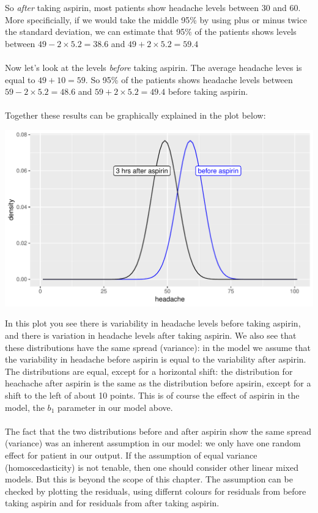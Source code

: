 \documentclass[]{report}\usepackage[]{graphicx}\usepackage[]{color}
\makeatletter
\def\maxwidth{ %
  \ifdim\Gin@nat@width>\linewidth
    \linewidth
  \else
    \Gin@nat@width
  \fi
}
\newenvironment{knitrout}{}{} %
\makeatother
\begin{document}
So \textit{after} taking aspirin, most patients show headache levels between 30 and 60. More specificially, if we would take the middle 95\% by using plus or minus twice the standard deviation, we can estimate that 95\% of the patients shows levels between $49 - 2 \times 5.2 = 38.6$ and $49 + 2 \times 5.2 = 59.4$
\\
\\
Now let's look at the levels \textit{before} taking aspirin. The average headache leves is equal to $49 + 10 = 59$. So 95\% of the patients shows headache levels between $59 - 2 \times 5.2 = 48.6$ and $59 + 2 \times 5.2 = 49.4$ before taking aspirin. 
\\
\\
Together these results can be graphically explained in the plot below:
\begin{knitrout}
\color{fgcolor}

{\centering \includegraphics[width=\maxwidth]{figure/resultsanalysisprepost2-1} 

}



\end{knitrout}


In this plot you see there is variability in headache levels before taking aspirin, and there is variation in headache levels after taking aspirin. We also see that these distributions have the same spread (variance): in the model we assume that the variability in headache before aspirin is equal to the variability after aspirin. The distributions are equal, except for a horizontal shift: the distribution for heachache after aspirin is the same as the distribution before apsirin, except for a shift to the left of about 10 points. This is of course the effect of aspirin in the model, the $b_1$ parameter in our model above. 
\\
\\
The fact that the two distributions before and after aspirin show the same spread (variance) was an inherent assumption in our model: we only have one random effect for patient in our output. If the assumption of equal variance (homoscedasticity) is not tenable, then one should consider other linear mixed models. But this is beyond the scope of this chapter. The assumption can be checked by plotting the residuals, using differnt colours for residuals from before taking aspirin and for residuals from after taking aspirin. 
\end{document}
